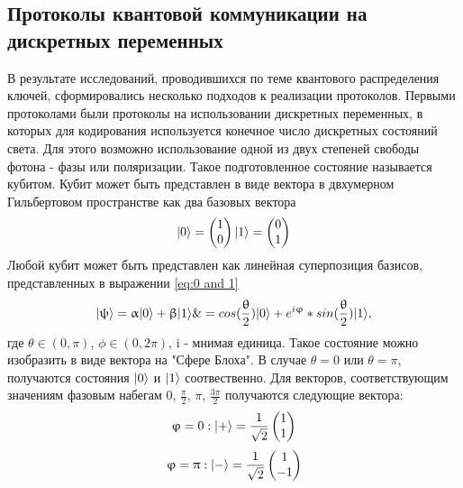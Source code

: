\subsection{Протоколы квантовой коммуникации на дискретных переменных }\label{sec:ch1/sect2/DVQKD prot}
 В результате исследований, проводившихся по теме квантового распределения ключей, сформировались несколько подходов к реализации протоколов. Первыми протоколами были протоколы на использовании дискретных переменных, в которых для кодирования  используется конечное число дискретных состояний света. Для этого возможно использование одной из двух степеней свободы фотона - фазы или поляризации. Такое подготовленное состояние называется кубитом. Кубит может быть представлен в виде вектора в двхумерном Гильбертовом пространстве как два базовых вектора
\begin{equation}
  \lvert0\rangle       =  \begin{pmatrix} 1 \\ 0 \end{pmatrix}
  \lvert1\rangle       =  \begin{pmatrix} 0 \\ 1 \end{pmatrix}
\end{equation}\label{eq:0 and 1}
Любой кубит может быть представлен как линейная суперпозиция базисов, представленных в выражении \ref{eq:0 and 1}
\begin{equation}
    \lvert\uppsi\rangle      = \upalpha\lvert0\rangle + \upbeta\lvert1\rangle \&=  cos(\frac{\uptheta}{2})\lvert0\rangle + e^{i\upvarphi} * sin(\frac{\uptheta}{2})\lvert1\rangle, 
\end{equation}\label{eq: superpos}
где $\theta \in (0, \pi)$, $\phi \in (0, 2\pi)$, i - мнимая единица. Такое состояние можно изобразить в виде вектора на "Сфере Блоха". В случае $\theta = 0 $ или $\theta = \pi $, получаются состояния $\lvert0\rangle$ и $\lvert1\rangle$ соотвественно. Для векторов, соответствующим значениям фазовым набегам {0, $\frac{\pi}{2}$, $\pi$, $\frac{3\pi}{2}$} получаются следующие вектора:
\begin{equation}
  \upvarphi = 0 : \lvert+\rangle= \frac{1}{\sqrt{2}} \begin{pmatrix} 1 \\ 1 \end{pmatrix}
\end{equation}\label{eq:0 phase vector}
\begin{equation}
  \upvarphi = \uppi : \lvert-\rangle= \frac{1}{\sqrt{2}} \begin{pmatrix} 1 \\ -1 \end{pmatrix}
\end{equation}\label{eq:pi phase vector}
